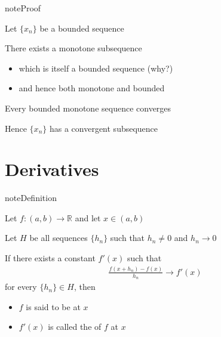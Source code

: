 \documentclass[letterpaper,10pt,english]{jupyterBook}
\begin{document}
\begin{sphinxadmonition}{note}{Proof}

\sphinxAtStartPar
Let \(\{x_n\}\) be a bounded sequence

\sphinxAtStartPar
There exists a monotone subsequence
\begin{itemize}
\item {} 
\sphinxAtStartPar
which is itself a bounded sequence  (why?)

\item {} 
\sphinxAtStartPar
and hence both monotone and bounded

\end{itemize}

\sphinxAtStartPar
Every bounded monotone sequence converges

\sphinxAtStartPar
Hence \(\{x_n\}\) has a convergent subsequence
\end{sphinxadmonition}


\section{Derivatives}
\label{\detokenize{04.basic_analysis:derivatives}}
\begin{sphinxadmonition}{note}{Definition}

\sphinxAtStartPar
Let \(f \colon (a, b) \to \mathbb{R}\) and let \(x \in (a, b)\)

\sphinxAtStartPar
Let \(H\) be all sequences \(\{h_n\}\) such that
\(h_n \ne 0\) and \(h_n \to 0\)

\sphinxAtStartPar
If there exists a constant \(f'(x)\) such that
\begin{equation*}
\begin{split}
\frac{f(x + h_n) - f(x)}{h_n} \to f'(x)
\end{split}
\end{equation*}
\sphinxAtStartPar
for every \(\{h_n\} \in H\), then
\begin{itemize}
\item {} 
\sphinxAtStartPar
\(f\) is said to be  at \(x\)

\item {} 
\sphinxAtStartPar
\(f'(x)\) is called the  of \(f\) at \(x\)

\end{itemize}
\end{sphinxadmonition}

\begin{figure}[htbp]
\centering

\noindent{}
\end{figure}
\end{document}
